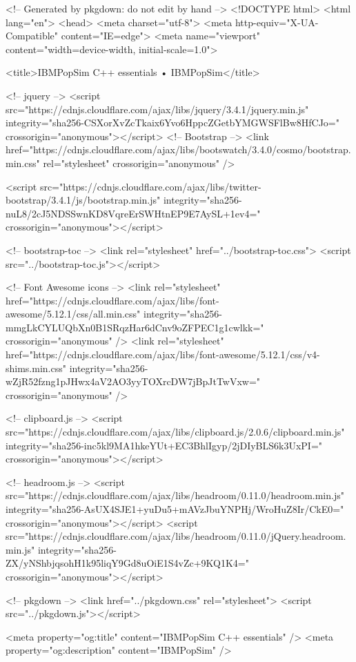 <!-- Generated by pkgdown: do not edit by hand -->
<!DOCTYPE html>
<html lang="en">
  <head>
  <meta charset="utf-8">
<meta http-equiv="X-UA-Compatible" content="IE=edge">
<meta name="viewport" content="width=device-width, initial-scale=1.0">

<title>IBMPopSim C++ essentials • IBMPopSim</title>


<!-- jquery -->
<script src="https://cdnjs.cloudflare.com/ajax/libs/jquery/3.4.1/jquery.min.js" integrity="sha256-CSXorXvZcTkaix6Yvo6HppcZGetbYMGWSFlBw8HfCJo=" crossorigin="anonymous"></script>
<!-- Bootstrap -->
<link href="https://cdnjs.cloudflare.com/ajax/libs/bootswatch/3.4.0/cosmo/bootstrap.min.css" rel="stylesheet" crossorigin="anonymous" />


<script src="https://cdnjs.cloudflare.com/ajax/libs/twitter-bootstrap/3.4.1/js/bootstrap.min.js" integrity="sha256-nuL8/2cJ5NDSSwnKD8VqreErSWHtnEP9E7AySL+1ev4=" crossorigin="anonymous"></script>

<!-- bootstrap-toc -->
<link rel="stylesheet" href="../bootstrap-toc.css">
<script src="../bootstrap-toc.js"></script>

<!-- Font Awesome icons -->
<link rel="stylesheet" href="https://cdnjs.cloudflare.com/ajax/libs/font-awesome/5.12.1/css/all.min.css" integrity="sha256-mmgLkCYLUQbXn0B1SRqzHar6dCnv9oZFPEC1g1cwlkk=" crossorigin="anonymous" />
<link rel="stylesheet" href="https://cdnjs.cloudflare.com/ajax/libs/font-awesome/5.12.1/css/v4-shims.min.css" integrity="sha256-wZjR52fzng1pJHwx4aV2AO3yyTOXrcDW7jBpJtTwVxw=" crossorigin="anonymous" />

<!-- clipboard.js -->
<script src="https://cdnjs.cloudflare.com/ajax/libs/clipboard.js/2.0.6/clipboard.min.js" integrity="sha256-inc5kl9MA1hkeYUt+EC3BhlIgyp/2jDIyBLS6k3UxPI=" crossorigin="anonymous"></script>

<!-- headroom.js -->
<script src="https://cdnjs.cloudflare.com/ajax/libs/headroom/0.11.0/headroom.min.js" integrity="sha256-AsUX4SJE1+yuDu5+mAVzJbuYNPHj/WroHuZ8Ir/CkE0=" crossorigin="anonymous"></script>
<script src="https://cdnjs.cloudflare.com/ajax/libs/headroom/0.11.0/jQuery.headroom.min.js" integrity="sha256-ZX/yNShbjqsohH1k95liqY9Gd8uOiE1S4vZc+9KQ1K4=" crossorigin="anonymous"></script>

<!-- pkgdown -->
<link href="../pkgdown.css" rel="stylesheet">
<script src="../pkgdown.js"></script>




<meta property="og:title" content="IBMPopSim C++ essentials" />
<meta property="og:description" content="IBMPopSim" />




